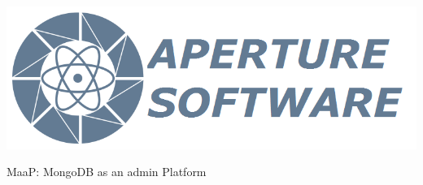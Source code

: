 \documentclass[a4paper]{article}
\newcommand{\Progetto}{MaaP: MongoDB as an admin Platform}
\begin{document}
\thispagestyle{empty}

\begin{center}\centerline{
\includegraphics[scale=0.8]{../Logo&Header/logo.png}}


\vspace{0.5in}

{\Huge {\Progetto}}\\[.5pc]

\underline{\hspace{6in}}\\[8pc]

{\Huge {\TipoDocumento}}\\[1pc]
\end{center}

\end{document}
